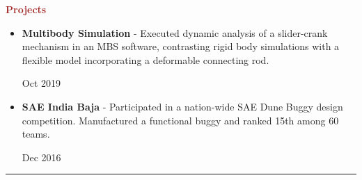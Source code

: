 \documentclass[11pt, letterpaper]{article}
\begin{document}
\noindent \textbf{\large \textcolor{Brown}{Projects}}\\
\begin{itemize}[leftmargin=*]
\setlength\itemsep{-2pt}
\vspace{-8pt}
\item \textbf{Multibody Simulation} - Executed dynamic analysis of a slider-crank mechanism in an MBS software, contrasting rigid body simulations with a flexible model incorporating a deformable connecting rod.\hfill \raggedright{Oct 2019}
\item \textbf{SAE India Baja} - Participated in a nation-wide SAE Dune Buggy design competition. Manufactured a functional buggy and ranked 15th among 60 teams. \hfill \raggedright{Dec 2016}
\end{itemize}
\vspace{-10pt}
\noindent \rule[2pt]{\textwidth}{0.5pt}
\end{document}
